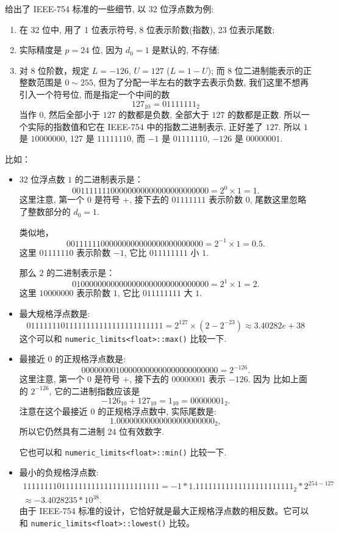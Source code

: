 \documentclass[a4paper]{ctexart}
\begin{document}
{ 给出了 IEEE-754 标准的一些细节, 以 32 位浮点数为例:
\begin{enumerate}
\item 在 32 位中, 用了 1 位表示符号, 8 位表示阶数(指数), 23 位表示尾数;
\item 实际精度是 $p = 24$ 位, 因为 $d_0 = 1$ 是默认的, 不存储;
\item 对 8 位阶数，规定 $L = -126$, $U = 127$ ($L = 1 - U$); 而 8 
位二进制能表示的正整数范围是 $0 \sim 255$, 但为了分配一半左右的数字去表示负数, 
我们这里不想再引入一个符号位, 而是指定一个中间的数 
$$
127_{10} = 01111111_{2}
$$
当作 $0$, 然后全部小于 $127$ 的数都是负数, 全部大于 $127$ 的数都是正数. 
所以一个实际的指数值和它在 IEEE-754 中的指数二进制表示, 正好差了 $127$.
所以 $1$ 是 $10000000$, 127 是 $11111110$, 而 $-1$ 是 $01111110$, $-126$ 是 $00000001$.

\end{enumerate}
比如：
\begin{itemize}
\item 32 位浮点数 $1$ 的二进制表示是：
$$
0 01111111 00000000000000000000000 = 2^{0} \times 1 = 1.
$$
这里注意, 第一个 $0$ 是符号 $+$, 接下去的 $01111111$ 表示阶数 $0$, 尾数这里忽略了整数部分的 $d_0 = 1$. 

类似地， 
$$
0 01111110 00000000000000000000000 = 2^{-1} \times 1 = 0.5.
$$
这里 $01111110$ 表示阶数 $-1$, 它比 $011111111$ 小 $1$.

那么 $2$ 的二进制表示是：
$$
0 10000000 00000000000000000000000 = 2^{1} \times 1 = 2.
$$
这里 $10000000$ 表示阶数 $1$, 它比 $011111111$ 大 $1$.

\item 最大规格浮点数是:
$$
0 11111110 11111111111111111111111 = 2^{127} \times (2 - 2^{-23}) \approx 3.40282e+38
$$
这个可以和 \verb|numeric_limits<float>::max()| 比较一下.

\item 最接近 $0$ 的正规格浮点数是:
$$
0 00000001 00000000000000000000000 = 2^{-126}.
$$
这里注意, 第一个 $0$ 是符号 $+$, 接下去的 $00000001$ 表示 $-126$. 因为  
比如上面的 $2^{-126}$, 它的二进制指数应该是 
$$
-126_{10} + 127_{10} = 1_{10} = 00000001_{2}.
$$ 
注意在这个最接近 $0$ 的正规格浮点数中, 实际尾数是:
$$
1.00000000000000000000000_{2},
$$
所以它仍然具有二进制 $24$ 位有效数字. 

它也可以和 \verb|numeric_limits<float>::min()| 比较一下.

\item 最小的负规格浮点数:
$$
\begin{array}{l}
1 11111110 11111111111111111111111 
= -1 * 1.11111111111111111111111_{2} * 2^{254-127} \\
\approx -3.4028235 * 10^{38}.
\end{array}
$$
由于 IEEE-754 标准的设计，它恰好就是最大正规格浮点数的相反数。它可以和
\verb|numeric_limits<float>::lowest()| 比较。
\end{itemize}

}
\end{document}
